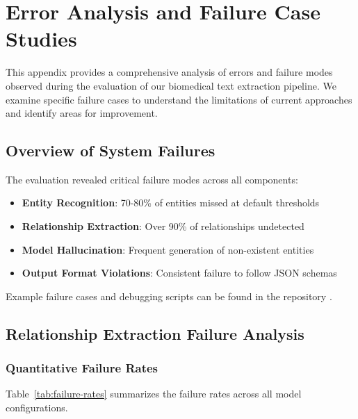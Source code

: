 
\chapter{Error Analysis and Failure Case Studies}

\label{AppendixC} %

This appendix provides a comprehensive analysis of errors and failure modes observed during the evaluation of our biomedical text extraction pipeline. We examine specific failure cases to understand the limitations of current approaches and identify areas for improvement.

\section{Overview of System Failures}

The evaluation revealed critical failure modes across all components:
\begin{itemize}
    \item \textbf{Entity Recognition}: 70-80\% of entities missed at default thresholds
    \item \textbf{Relationship Extraction}: Over 90\% of relationships undetected
    \item \textbf{Model Hallucination}: Frequent generation of non-existent entities
    \item \textbf{Output Format Violations}: Consistent failure to follow JSON schemas
\end{itemize}

Example failure cases and debugging scripts can be found in the repository \cite{githubthesis2025}.

\section{Relationship Extraction Failure Analysis}

\subsection{Quantitative Failure Rates}

Table~\ref{tab:failure-rates} summarizes the failure rates across all model configurations.


